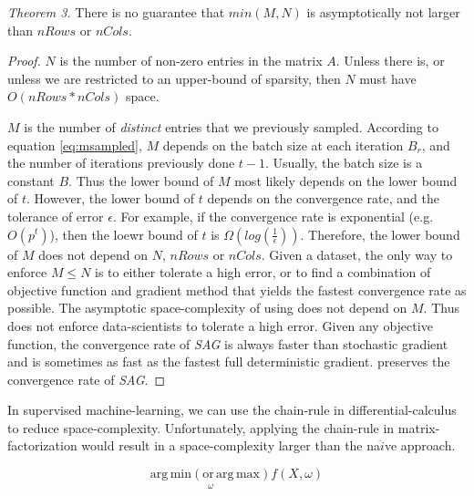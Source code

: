 \emph{Theorem 3.}  There is no guarantee that $min(M,N)$ is asymptotically not larger than $nRows$ or $nCols$.
\begin{proof}
$N$ is the number of non-zero entries in the matrix $A$.
Unless there is, or unless we are restricted to an upper-bound of sparsity, then $N$ must have $O(nRows*nCols)$ space.

$M$ is the number of \emph{distinct} entries that we previously sampled.
According to equation \ref{eq:msampled}, $M$ depends on the batch size at each iteration $B_r$, and the number of iterations previously done $t-1$.
Usually, the batch size is a constant $B$.  Thus the lower bound of $M$ most likely depends on the lower bound of $t$.
However, the lower bound of $t$ depends on the convergence rate, and the tolerance of error $\epsilon$.
For example, if the convergence rate is exponential (e.g. $O(p^t)$), then the loewr bound of $t$ is $\Omega(log(\frac{1}{\epsilon}))$.
Therefore, the lower bound of $M$ does not depend on $N$, $nRows$ or $nCols$.
Given a dataset, the only way to enforce $M \leq N$ is to either tolerate a high error, or to find a combination of objective function and gradient method that yields the fastest convergence rate as possible.
The asymptotic space-complexity of using \tool does not depend on $M$.
Thus \tool does not enforce data-scientists to tolerate a high error.
Given any objective function, the convergence rate of \emph{SAG} \cite{schmidt2013minimizing, roux2012stochastic} is always faster than stochastic gradient and is sometimes as fast as the fastest full deterministic gradient.
\tool preserves the convergence rate of \emph{SAG}.
\end{proof}

In supervised machine-learning, we can use the chain-rule in differential-calculus to reduce space-complexity.
Unfortunately, applying the chain-rule in matrix-factorization would result in a space-complexity larger than the na$\ddot{i}$ve approach.


\begin{equation} \label{eq:sml}
\operatorname*{arg\,min (or\,arg\,max)}_{\omega} f(X, \omega)
\end{equation}